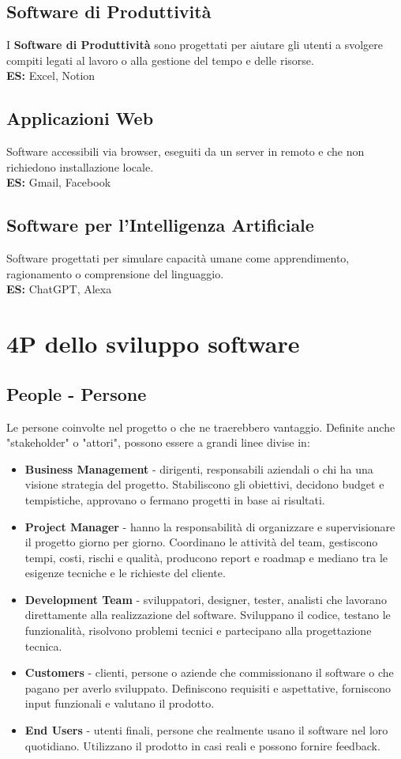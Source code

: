\subsection{Software di Produttività}
I \textbf{Software di Produttività} sono progettati per aiutare gli utenti a svolgere compiti legati al lavoro o alla gestione del tempo e delle risorse. \\
\textbf{ES:} Excel, Notion
\subsection{Applicazioni Web}
Software accessibili via browser, eseguiti da un server in remoto e che non richiedono installazione locale. \\
\textbf{ES:} Gmail, Facebook
\subsection{Software per l'Intelligenza Artificiale}
Software progettati per simulare capacità umane come apprendimento, ragionamento o comprensione del linguaggio. \\
\textbf{ES:} ChatGPT, Alexa
\section{4P dello sviluppo software}
\subsection{People - Persone}
Le persone coinvolte nel progetto o che ne traerebbero vantaggio. Definite anche "{stakeholder}" o "{attori}", possono essere a grandi linee divise in:
\begin{itemize}
    \item \textbf{Business Management} - dirigenti, responsabili aziendali o chi ha una visione strategia del progetto. Stabiliscono gli obiettivi, decidono budget e tempistiche, approvano o fermano progetti in base ai risultati.
    \item \textbf{Project Manager} - hanno la responsabilità di organizzare e supervisionare il progetto giorno per giorno. Coordinano le attività del team, gestiscono tempi, costi, rischi e qualità, producono report e roadmap e mediano tra le esigenze tecniche e le richieste del cliente.
    \item \textbf{Development Team} - sviluppatori, designer, tester, analisti che lavorano direttamente alla realizzazione del software. Sviluppano il codice, testano le funzionalità, risolvono problemi tecnici e partecipano alla progettazione tecnica.
    \item \textbf{Customers} - clienti, persone o aziende che commissionano il software o che pagano per averlo sviluppato. Definiscono requisiti e aspettative, forniscono input funzionali e valutano il prodotto.
    \item \textbf{End Users} - utenti finali, persone che realmente usano il software nel loro quotidiano. Utilizzano il prodotto in casi reali e possono fornire feedback.
\end{itemize}
